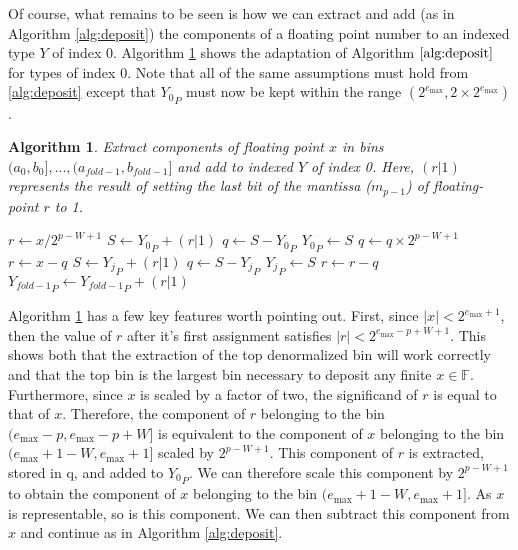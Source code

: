 \documentclass[12pt]{article}
\providecommand{\F}{\ensuremath{\mathbb{F}}}
\providecommand{\max}{\ensuremath{\text{max}}}
\theoremstyle{plain}
\newtheorem{alg}{Algorithm}[section]
\begin{document}
      Of course, what remains to be seen is how we can extract and add (as in Algorithm \ref{alg:deposit}) the components of a floating point number to an indexed type $Y$ of index 0. Algorithm \ref{alg:deposit0} shows the adaptation of Algorithm $\ref{alg:deposit}$ for types of index 0. Note that all of the same assumptions must hold from \ref{alg:deposit} except that ${Y_0}_P$ must now be kept within the range $(2^{e_{\max}}, 2 \times 2^{e_{\max}})$.
      \begin{alg}
        Extract components of floating point $x$ in bins $(a_0, b_0], ..., (a_{fold - 1}, b_{fold - 1}]$ and add to indexed $Y$ of index 0. Here, $(r | 1)$ represents the result of setting the last bit of the mantissa ($m_{p - 1}$) of floating-point $r$ to 1.
        \begin{algorithmic}
            \State $r \gets x / 2^{p - W + 1}$
            \State $S \gets {Y_0}_P + (r | 1)$
            \State $q \gets S - {Y_0}_P$
            \State ${Y_0}_P \gets S$
            \State $q \gets q \times 2^{p - W + 1}$
            \State $r \gets x - q$
              \State $S \gets {Y_j}_P + (r | 1)$
              \State $q \gets S - {Y_j}_P$
              \State ${Y_j}_P \gets S$
              \State $r \gets r - q$
            \EndFor
            \State ${Y_{fold - 1}}_P \gets {Y_{fold - 1}}_P + (r | 1)$
          \EndFunction
        \end{algorithmic}
        \label{alg:deposit0}
      \end{alg}

      Algorithm \ref{alg:deposit0} has a few key features worth pointing out. First, since $|x| < 2^{e_{\max} + 1}$, then the value of $r$ after it's first assignment satisfies $|r| < 2^{e_{\max} - p + W + 1}$. This shows both that the extraction of the top denormalized bin will work correctly and that the top bin is the largest bin necessary to deposit any finite $x \in \F$.
      Furthermore, since $x$ is scaled by a factor of two, the significand of $r$ is equal to that of $x$.
      Therefore, the component of $r$ belonging to the bin $(e_{\max} - p, e_{\max} - p + W]$ is equivalent to the component of $x$ belonging to the bin $(e_{\max} + 1 - W, e_{\max} + 1]$ scaled by $2^{p - W + 1}$. This component of $r$ is extracted, stored in q, and added to ${Y_0}_P$. We can therefore scale this component by $2^{p - W + 1}$ to obtain the component of $x$ belonging to the bin $(e_{\max} + 1 - W, e_{\max} + 1]$. As $x$ is representable, so is this component. We can then subtract this component from $x$ and continue as in Algorithm \ref{alg:deposit}.
\end{document}
